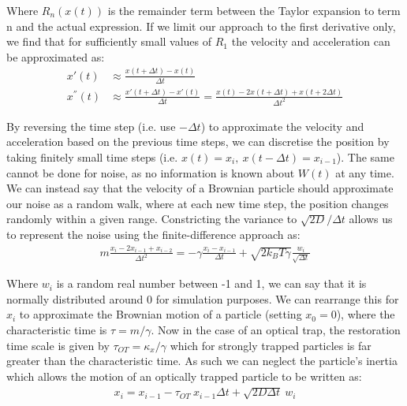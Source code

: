 Where $R_n(x(t))$ is the remainder term between the Taylor 
expansion to term n and the actual expression. If we limit our 
approach to the first derivative only, we find that for 
sufficiently small values of $R_1$ the velocity and acceleration 
can be approximated as:
\begin{align}
	x'(t) &\approx \frac{x(t+\Delta t)-x(t)}{\Delta t}
	\\
	x^{''}(t) &\approx \frac{x'(t+\Delta t)-x'(t)}{\Delta t} = \frac{x(t)-2x(t+\Delta t)+x(t+2\Delta t)}{\Delta t^2}
\end{align}

By reversing the time step (i.e. use $-\Delta t$) to approximate 
the velocity and acceleration based on the previous time steps, 
we can discretise the position by taking finitely small  time 
steps (i.e. $x(t) = x_i,\ x(t-\Delta t) = x_{i-1}$). The same 
cannot be done for noise, as no information is known about $W(t)$ 
at any time. We can instead say that the velocity of a Brownian 
particle should approximate our noise as a random walk, where at 
each new time step, the position changes randomly within a given 
range. Constricting the variance to $\sqrt{2D}/\Delta t$ allows 
us to represent the noise using the finite-difference approach as:
\begin{align}
	m\frac{x_i-2x_{i-1}+x_{i-2}}{\Delta t^2} = -\gamma\frac{x_i-x_{i-1}}{\Delta t}+\sqrt{2k_BT\gamma}\frac{w_i}{\sqrt{\Delta t}}
\end{align}

Where $w_i$ is a random real number between -1 and 1, we can say 
that it is normally distributed around 0 for simulation purposes. 
We can rearrange this for $x_i$ to approximate the Brownian motion 
of a particle (setting $x_0=0$), where the characteristic time is 
$\tau = m/\gamma$. Now in the case of an optical trap, the 
restoration time scale is given by $\tau_{OT}=\kappa_x/\gamma$ 
which for strongly trapped particles is far greater than the 
characteristic time. As such we can neglect the particle's inertia 
which allows the motion of an optically trapped particle to be written 
as:
\begin{align}
	\label{eq:sim_langevin}
	x_i = x_{i-1} - \tau_{OT}\ x_{i-1}\Delta t + \sqrt{2D\Delta t}\ w_i
\end{align} 

